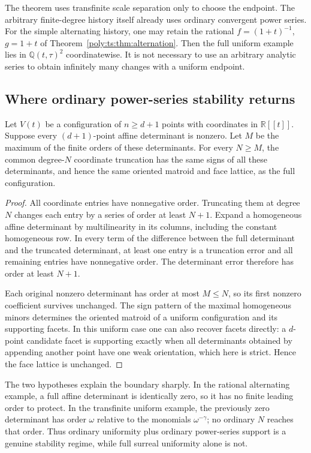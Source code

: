 \documentclass[11pt,a4paper]{article}
\numberwithin{equation}{section}
\theoremstyle{plain}
\newcommand{\R}{\mathbb R}
\newcommand{\Q}{\mathbb Q}
\begin{document}
The theorem uses transfinite scale separation only to choose the endpoint.
The arbitrary finite-degree history itself already uses ordinary convergent
power series. For the simple alternating history, one may retain the
rational $f=(1+t)^{-1}$, $g=1+t$ of
Theorem~\ref{poly:ts:thm:alternation}. Then the full uniform example lies in
$\Q(t,\tau)^2$ coordinatewise. It is not necessary to use an arbitrary
analytic series to obtain infinitely many changes with a uniform endpoint.

\subsection{Where ordinary power-series stability returns}
\begin{proposition}\label{poly:ts:prop:generic-stability}
Let $V(t)$ be a configuration of $n\ge d+1$ points with coordinates in
$\R[[t]]$. Suppose every $(d+1)$-point affine determinant is nonzero.
Let $M$ be the maximum of the finite orders of these determinants.
For every $N\ge M$, the common degree-$N$ coordinate truncation has the
same signs of all these determinants, and hence the same oriented matroid
and face lattice, as the full configuration.
\end{proposition}
\begin{proof}
All coordinate entries have nonnegative order. Truncating them at degree
$N$ changes each entry by a series of order at least $N+1$. Expand a
homogeneous affine determinant by multilinearity in its columns, including
the constant homogeneous row. In every term of the difference between the
full determinant and the truncated determinant, at least one entry is a
truncation error and all remaining entries have nonnegative order.
The determinant error therefore has order at least $N+1$.

Each original nonzero determinant has order at most $M\le N$, so its
first nonzero coefficient survives unchanged. The sign pattern of the
maximal homogeneous minors determines the oriented matroid of a uniform
configuration and its supporting facets. In this uniform case one can
also recover facets directly: a $d$-point candidate facet is supporting
exactly when all determinants obtained by appending another point have
one weak orientation, which here is strict. Hence the face lattice is
unchanged.
\end{proof}

The two hypotheses explain the boundary sharply. In the rational
alternating example, a full affine determinant is identically zero, so
it has no finite leading order to protect. In the transfinite uniform
example, the previously zero determinant has order $\omega$ relative
to the monomials $\omega^{-\gamma}$; no ordinary $N$ reaches that order.
Thus ordinary uniformity plus ordinary power-series support is a genuine
stability regime, while full surreal uniformity alone is not.
\end{document}
